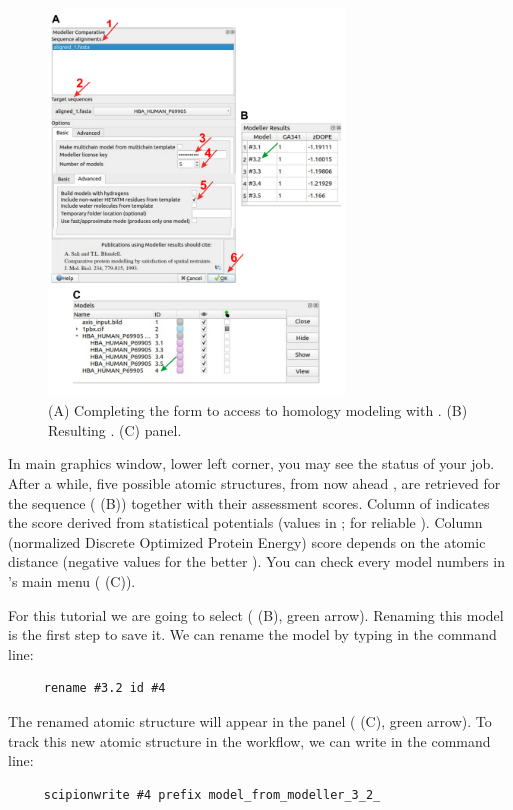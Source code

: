   \begin{figure}[H]
  \centering 
  \captionsetup{width=.7\linewidth} 
  \includegraphics[width=0.7\textwidth]{Images/Fig15}
  \caption{(A) Completing the form to access to homology modeling with \modeller. (B) Resulting . (C) \chimera {} panel.}
  \label{fig:modeller}
  \end{figure}

In \chimera main graphics window, lower left corner, you may see the status of your job. After a while, five possible atomic structures, from now ahead , are retrieved for the  sequence ( (B)) together with their assessment scores. Column  of  indicates the score derived from statistical potentials (values in \ttt{[0,1]};  for reliable ). Column  (normalized Discrete Optimized Protein Energy) score depends on the atomic distance (negative values for the better ). You can check every model numbers in \chimera's main menu ( (C)).

For this tutorial we are going to select    ( (B), green arrow). Renaming this model is the first step to save it. We can rename the model by typing in the \chimera command line:
 \begin{verbatim}
     rename #3.2 id #4
 \end{verbatim}
The renamed atomic structure will appear in the  panel ( (C), green arrow). To track this new atomic structure in the \scipion workflow, we can write in the \chimera command line:
\begin{verbatim}
     scipionwrite #4 prefix model_from_modeller_3_2_
 \end{verbatim}
 
